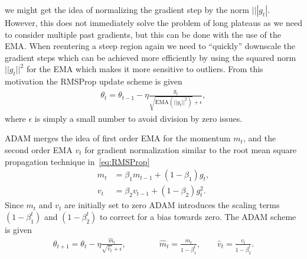 we might get the idea of normalizing the gradient step by the norm $|||g_t|$. However, this does not immediately solve the problem of long plateaus as we need to consider multiple past gradients, but this can be done with the use of the \acrshort{EMA}. When reentering a steep region again we need to ``quickly'' downscale the gradient steps which can be achieved more efficiently by using the squared norm $||g_t||^2$ for the \acrshort{EMA} which makes it more sensitive to outliers. From this motivation the \acrshort{RMSProp} update scheme is given
\begin{align}
  \theta_t = \theta_{t-1} - \eta \frac{g_t}{\sqrt{\text{EMA}(||g_t||^2)}+ \epsilon},
  \label{eq:RMSProp}
\end{align}
where $\epsilon$ is simply a small number to avoid division by zero issues. 

ADAM merges the idea of first order \acrshort{EMA} for the momentum $m_t$, and the second order \acrshort{EMA} $v_t$ for gradient normalization similar to the root mean square propagation technique in~\cref{eq:RMSProp}
\begin{align*}
  m_t &= \beta_1 m_{t-1} + (1-\beta_1)g_t, \\
  v_t &= \beta_2 v_{t-1} + (1-\beta_2)g_t^2. 
\end{align*}
Since $m_t$ and $v_t$ are initially set to zero ADAM introduces the scaling terms  $(1-\beta^t_1)$ and $(1-\beta^t_2)$ to correct for a bias towards zero. The ADAM scheme is given~\cite{kingma2017adam}
\begin{align}
  \theta_{t+1} = \theta_t - \eta \frac{\hat{m}_t}{\sqrt{\hat{v}_t} + \epsilon}, \qquad \qquad \hat{m}_t = \frac{m_t}{1-\beta^t_1}, \qquad \hat{v}_t = \frac{v_t}{1-\beta^t_2}.
  \label{eq:ADAM}
\end{align}


